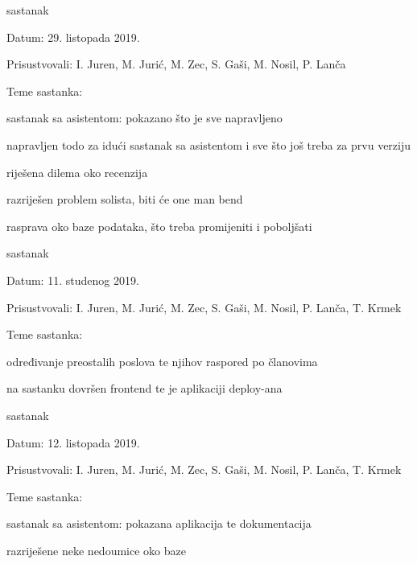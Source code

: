 \begin{packed_enum}
			\item  sastanak
			\item[] \begin{packed_item}
				\item Datum: 29. listopada 2019.
				\item Prisustvovali: I. Juren, M. Jurić, M. Zec, S. Gaši, M. Nosil, P. Lanča
				\item Teme sastanka:
				\begin{packed_item}
					\item  sastanak sa asistentom: pokazano što je sve napravljeno
					\item  napravljen todo za idući sastanak sa asistentom i sve što još treba za prvu verziju
					\item  riješena dilema oko recenzija
					\item  razriješen problem solista, biti će one man bend
					\item  rasprava oko baze podataka, što treba promijeniti i poboljšati
				\end{packed_item}
			\end{packed_item}
			
			\item  sastanak
			\item[] \begin{packed_item}
				\item Datum: 11. studenog 2019.
				\item Prisustvovali: I. Juren, M. Jurić, M. Zec, S. Gaši, M. Nosil, P. Lanča, T. Krmek
				\item Teme sastanka:
				\begin{packed_item}
					\item  određivanje preostalih poslova te njihov raspored po članovima
					\item  na sastanku dovršen frontend te je aplikaciji deploy-ana 
				\end{packed_item}
			\end{packed_item}
			
			\item  sastanak
			\item[] \begin{packed_item}
				\item Datum: 12. listopada 2019.
				\item Prisustvovali: I. Juren, M. Jurić, M. Zec, S. Gaši, M. Nosil, P. Lanča, T. Krmek
				\item Teme sastanka:
				\begin{packed_item}
					\item  sastanak sa asistentom: pokazana aplikacija te dokumentacija
					\item  razriješene neke nedoumice oko baze
				\end{packed_item}
			\end{packed_item}
			
			
		\end{packed_enum}
		
